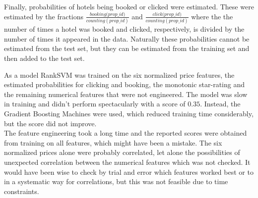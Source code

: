 \documentclass{llncs}
\begin{document}
Finally, probabilities of hotels being booked or clicked were estimated. These were estimated by the fractions $\displaystyle \frac{\textit{booking(prop\_id)}}{counting(prop\_id)}$ and $\displaystyle \frac{\textit{click(prop\_id)}}{counting(prop\_id)}$ where the the number of times a hotel was booked and clicked, respectively, is divided by the number of times it appeared in the data. Naturally these probabilities cannot be estimated from the test set, but they can be estimated from the training set and then added to the test set.

As a model RankSVM was trained on the six normalized price features, the estimated probabilities for clicking and booking, the monotonic star-rating and the remaining numerical features that were not engineered. The model was slow in training and didn't perform spectacularly with a score of $0.35$. Instead, the Gradient Boosting Machines were used, which reduced training time considerably, but the score did not improve.\\
\indent The feature engineering took a long time and the reported scores were obtained from training on all features, which might have been a mistake. The six normalized prices alone were probably correlated, let alone the possibilities of unexpected correlation between the numerical features which was not checked. It would have been wise to check by trial and error which features worked best or to in a systematic way for correlations, but this was not feasible due to time constraints. 
\end{document}
